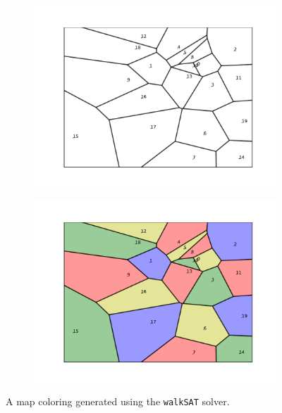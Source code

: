 \documentclass{article}
\begin{document}
    \vspace{-2mm}
    \begin{figure}[H]
        \centering
        \begin{subfigure}{0.49\textwidth}
            \centering
            \includegraphics[scale = .5]{sp23/hw-supplements/hw3-supp/blank_map.pdf}
        \end{subfigure}
        \begin{subfigure}{0.49\textwidth}
            \centering
            \includegraphics[scale = .5]{sp23/hw-supplements/hw3-supp/colored_map.pdf}
        \end{subfigure}
        \caption{A map coloring generated using the \lstinline{walkSAT} solver.}
        \label{fig:walkSAT}
    \end{figure}
\end{document}
